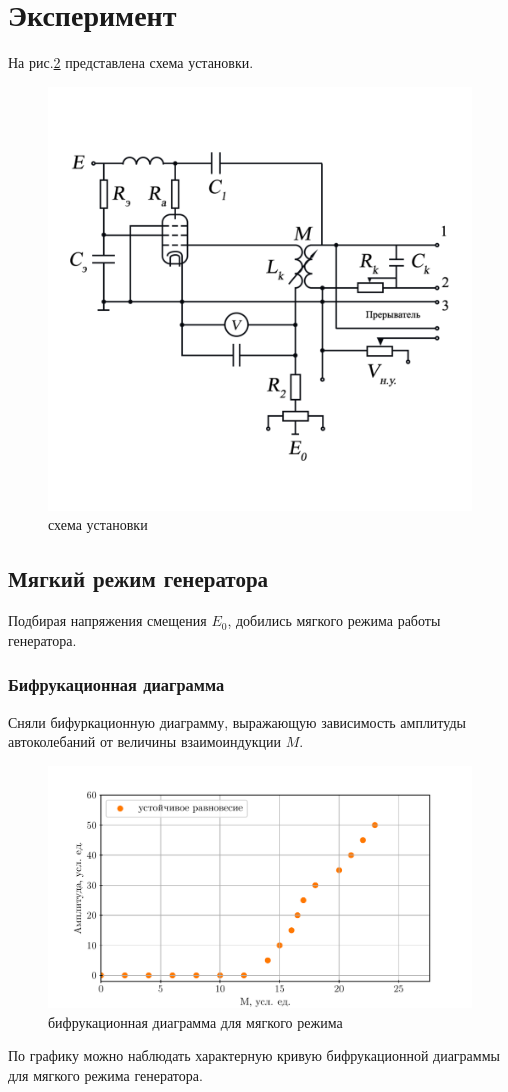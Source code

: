 \begin{center}
\begin{figure}[h!]
\begin{minipage}{0.49\linewidth}
        \vspace{-50pt}
        \label{fig:15}
    \end{minipage}
    \caption{}
    \label{fig:16}
    \vspace{-40pt}
    \end{figure}
\end{center} 

\newpage
\section{Эксперимент}
На рис.\ref{fig1} представлена схема установки.
\begin{figure}[h]
	\centering
	\vspace{-10pt}
	\includegraphics[width=0.35\linewidth]{photo/pics/scheme.png}
	\vspace{-20pt}
	\caption{схема установки}
	\label{fig1}
\end{figure}
\subsection{Мягкий режим генератора}
Подбирая напряжения смещения $E_0$, добились мягкого режима работы генератора.
\subsubsection{Бифрукационная диаграмма}
Сняли бифуркационную диаграмму, выражающую зависимость амплитуды автоколебаний от величины взаимоиндукции $M$.
\begin{figure}[h]
	\centering
	\vspace{-10pt}
	\includegraphics[]{plots/softdiagram.pdf}
	\caption{бифрукационная диаграмма для мягкого режима}
	\label{fig2}
\end{figure}
По графику можно наблюдать характерную кривую бифрукационной диаграммы для мягкого режима генератора.
